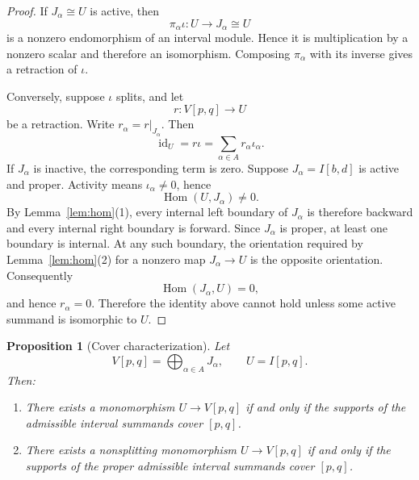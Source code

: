 \documentclass[11pt]{amsart}
\numberwithin{equation}{section}
\newtheorem{proposition}[theorem]{Proposition}
\theoremstyle{definition}
\begin{document}
\begin{proof}
If $J_\alpha\cong U$ is active, then
\[
\pi_\alpha\iota:U\longrightarrow J_\alpha\cong U
\]
is a nonzero endomorphism of an interval module.  Hence it is multiplication
by a nonzero scalar and therefore an isomorphism.  Composing $\pi_\alpha$
with its inverse gives a retraction of $\iota$.

Conversely, suppose $\iota$ splits, and let
\[
r:V[p,q]\longrightarrow U
\]
be a retraction.  Write $r_\alpha=r|_{J_\alpha}$.  Then
\[
\operatorname{id}_U=r\iota=\sum_{\alpha\in A}r_\alpha\iota_\alpha.
\]
If $J_\alpha$ is inactive, the corresponding term is zero.  Suppose
$J_\alpha=I[b,d]$ is active and proper.  Activity means
$\iota_\alpha\ne0$, hence
\[
\operatorname{Hom}(U,J_\alpha)\ne0.
\]
By Lemma~\ref{lem:hom}(1), every internal left boundary of $J_\alpha$ is
therefore backward and every internal right boundary is forward.  Since
$J_\alpha$ is proper, at least one boundary is internal.  At any such
boundary, the orientation required by Lemma~\ref{lem:hom}(2) for a nonzero
map $J_\alpha\to U$ is the opposite orientation.  Consequently
\[
\operatorname{Hom}(J_\alpha,U)=0,
\]
and hence $r_\alpha=0$.  Therefore the identity above cannot hold unless some
active summand is isomorphic to $U$.
\end{proof}

\begin{proposition}[Cover characterization]\label{prop:cover-characterization}
Let
\[
V[p,q]=\bigoplus_{\alpha\in A}J_\alpha,
\qquad U=I[p,q].
\]
Then:
\begin{enumerate}
\item There exists a monomorphism $U\to V[p,q]$ if and only if the supports
of the admissible interval summands cover $[p,q]$.
\item There exists a nonsplitting monomorphism $U\to V[p,q]$ if and only if
the supports of the proper admissible interval summands cover $[p,q]$.
\end{enumerate}
\end{proposition}
\end{document}

